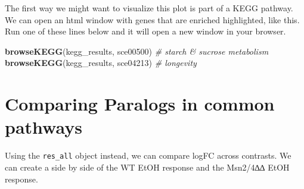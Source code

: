 \documentclass[
]{book}
\newenvironment{Shaded}{\begin{snugshade}}{\end{snugshade}}
\newcommand{\CommentTok}[1]{\textcolor[rgb]{0.56,0.35,0.01}{\textit{#1}}}
\newcommand{\FunctionTok}[1]{\textcolor[rgb]{0.13,0.29,0.53}{\textbf{#1}}}
\newcommand{\NormalTok}[1]{#1}
\newcommand{\StringTok}[1]{\textcolor[rgb]{0.31,0.60,0.02}{#1}}
\begin{document}
The first way we might want to visualize this plot is part of a KEGG pathway. We can open an html window with genes that are enriched highlighted, like this. Run one of these lines below and it will open a new window in your browser.

\begin{Shaded}
\begin{Highlighting}[]
\FunctionTok{browseKEGG}\NormalTok{(kegg\_results, }\StringTok{\textquotesingle{}sce00500\textquotesingle{}}\NormalTok{)  }\CommentTok{\# starch \& sucrose metabolism}
\FunctionTok{browseKEGG}\NormalTok{(kegg\_results, }\StringTok{\textquotesingle{}sce04213\textquotesingle{}}\NormalTok{)  }\CommentTok{\# longevity}
\end{Highlighting}
\end{Shaded}

\hypertarget{comparing-paralogs-in-common-pathways}{%
\section{Comparing Paralogs in common pathways}\label{comparing-paralogs-in-common-pathways}}

Using the \texttt{res\_all} object instead, we can compare logFC across contrasts.
We can create a side by side of the WT EtOH response and the Msn2/4∆∆ EtOH response.
\end{document}
